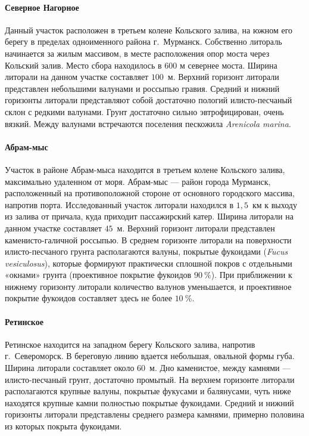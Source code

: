             \paragraph{Северное Нагорное}
Данный участок расположен в третьем колене Кольского залива, на южном его берегу в пределах одноименного района г.~Мурманск. 
Собственно литораль начинается за жилым массивом, в месте расположения опор моста через Кольский залив. 
Место сбора находилось в 600 м севернее моста. 
Ширина литорали на данном участке составляет $100$~м. 
Верхний горизонт литорали представлен небольшими валунами и россыпью гравия. 
Средний и нижний горизонты литорали представляют собой достаточно пологий илисто-песчаный склон с редкими валунами. 
Грунт достаточно сильно эвтрофицирован, очень вязкий. 
Между валунами встречаются поселения пескожила {\it Arenicola marina}.

            \paragraph{Абрам-мыс}
Участок  в районе  Абрам-мыса  находится в третьем колене Кольского залива, максимально удаленном от моря.
Абрам-мыс --- район   города   Мурманск,  расположенный   на противоположной стороне от основного городского массива, напротив порта. 
Исследованный участок   литорали   находился   в   $1,5$~км   к   выходу   из   залива   от   причала,   куда   приходит пассажирский катер. 
Ширина   литорали   на   данном   участке   составляет   $45$~м.   
Верхний   горизонт   литорали представлен  каменисто-галичной  россыпью. 
В среднем  горизонте литорали на поверхности илисто-песчаного   грунта   располагаются   валуны,   покрытые   фукоидами   ({\it Fucus  vesiculosus}), которые   формируют   практически   сплошной   покров   с   отдельными   «окнами»   грунта (проективное  покрытие фукоидов $90~\%$).  
При приближении  к нижнему горизонту литорали количество   валунов   уменьшается,   и   проективное   покрытие   фукоидов   составляет   здесь   не более $10~\%$.

    \paragraph{Ретинское}
Ретинское находится на западном берегу Кольского залива, напротив г.~Североморск. 
В береговую линию вдается небольшая, овальной формы губа. 
Ширина литорали составляет около $60$~м. 
Дно каменистое, между камнями --- илисто-песчаный грунт, достаточно промытый. 
На верхнем горизонте литорали располагаются крупные валуны, покрытые фукусами и балянусами, чуть ниже находятся крупные камни полностью покрытые фукоидами.
Средний и нижний горизонты литорали представлены среднего размера камнями, примерно половина из которых покрыта фукоидами. 

